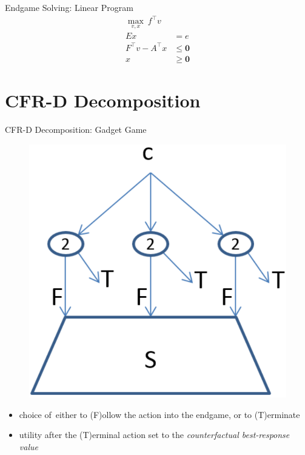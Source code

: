 \documentclass{beamer}
\theoremstyle{definition}
\newcommand{\vect}[1]{\boldsymbol{#1}}
\begin{document}
  \begin{frame}{Endgame Solving: Linear Program}
    \begin{equation*}
      \label{lp:endgame-solving}
      \begin{split}
        \max_{v, x}\  f^\top v & \\
        Ex &= e \\
        F^\top v - A^\top x &\le \vect{0} \\
        x &\ge \vect{0}
      \end{split}
    \end{equation*}
  \end{frame}

  \section{CFR-D Decomposition}
  \begin{frame}{CFR-D Decomposition: Gadget Game}
    \begin{figure}[H]
      \centering
      \includegraphics[width=.4\textwidth]{../img/re-solving-game-gadget.png}
    \end{figure}
    \pause

    \begin{itemize}[<+- | alert@+>]
      \item choice of~either to (F)ollow the action into the endgame, or to (T)erminate
      \item utility after the (T)erminal action set to the \emph{counterfactual best-response value}
    \end{itemize}
  \end{frame}
\end{document}
